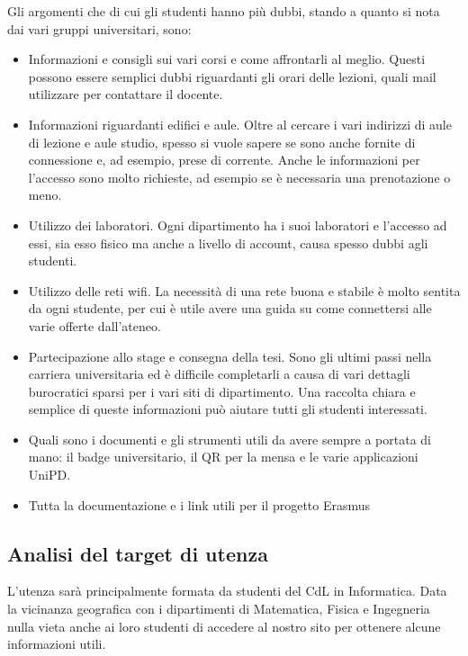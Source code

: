 Gli argomenti che di cui gli studenti hanno più dubbi, stando a quanto si nota dai vari gruppi universitari, sono:
\begin{itemize}
    \item Informazioni e consigli sui vari corsi e come affrontarli al meglio. Questi possono essere semplici dubbi riguardanti gli orari delle lezioni, quali mail utilizzare per contattare il docente.
    \item Informazioni riguardanti edifici e aule. Oltre al cercare i vari indirizzi di aule di lezione e aule studio, spesso si vuole sapere se sono anche fornite di connessione e, ad esempio, prese di corrente. Anche le informazioni per l'accesso sono molto richieste, ad esempio se è necessaria una prenotazione o meno. 
    \item Utilizzo dei laboratori. Ogni dipartimento ha i suoi laboratori e l'accesso ad essi, sia esso fisico ma anche a livello di account, causa spesso dubbi agli studenti.
    \item Utilizzo delle reti wifi. La necessità di una rete buona e stabile è molto sentita da ogni studente, per cui è utile avere una guida su come connettersi alle varie offerte dall'ateneo.   
    \item Partecipazione allo stage e consegna della tesi. Sono gli ultimi passi nella carriera universitaria ed è difficile completarli a causa di vari dettagli burocratici sparsi per i vari siti di dipartimento. Una raccolta chiara e semplice di queste informazioni può aiutare tutti gli studenti interessati.
    \item Quali sono i documenti e gli strumenti utili da avere sempre a portata di mano: il badge universitario, il QR per la mensa e le varie applicazioni UniPD.
    \item Tutta la documentazione e i link utili per il progetto Erasmus
\end{itemize}

\subsection{Analisi del target di utenza}

L'utenza sarà principalmente formata da studenti del CdL in Informatica. Data la vicinanza geografica con i dipartimenti di Matematica, Fisica e Ingegneria nulla vieta anche ai loro studenti di accedere al nostro sito per ottenere alcune informazioni utili.

